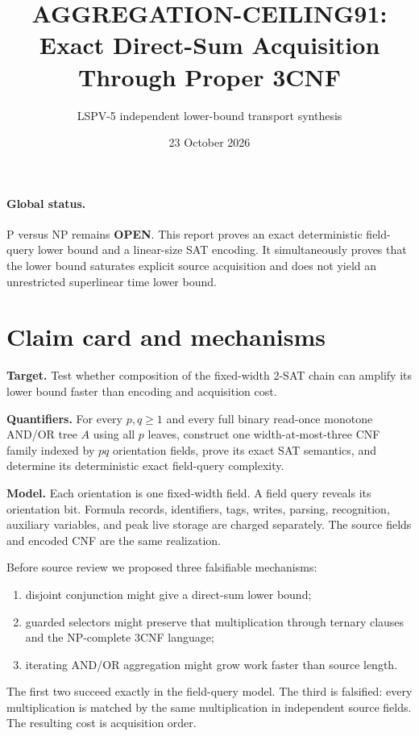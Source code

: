 \documentclass[11pt]{article}
\title{AGGREGATION-CEILING91:\\Exact Direct-Sum Acquisition Through Proper 3CNF}
\author{LSPV-5 independent lower-bound transport synthesis}
\date{23 October 2026}
\begin{document}
\maketitle

\paragraph{Global status.}
P versus NP remains \textbf{OPEN}.  This report proves an exact deterministic
field-query lower bound and a linear-size SAT encoding.  It simultaneously
proves that the lower bound saturates explicit source acquisition and does not
yield an unrestricted superlinear time lower bound.

\section{Claim card and mechanisms}
\textbf{Target.} Test whether composition of the fixed-width 2-SAT chain can
amplify its lower bound faster than encoding and acquisition cost.

\textbf{Quantifiers.} For every $p,q\ge1$ and every full binary read-once
monotone AND/OR tree $A$ using all $p$ leaves, construct one width-at-most-three
CNF family indexed by $pq$ orientation fields, prove its exact SAT semantics,
and determine its deterministic exact field-query complexity.

\textbf{Model.} Each orientation is one fixed-width field.  A field query
reveals its orientation bit.  Formula records, identifiers, tags, writes,
parsing, recognition, auxiliary variables, and peak live storage are charged
separately.  The source fields and encoded CNF are the same realization.

Before source review we proposed three falsifiable mechanisms:
\begin{enumerate}
\item disjoint conjunction might give a direct-sum lower bound;
\item guarded selectors might preserve that multiplication through ternary
clauses and the NP-complete 3CNF language;
\item iterating AND/OR aggregation might grow work faster than source length.
\end{enumerate}
The first two succeed exactly in the field-query model.  The third is
falsified: every multiplication is matched by the same multiplication in
independent source fields.  The resulting cost is acquisition order.
\end{document}
